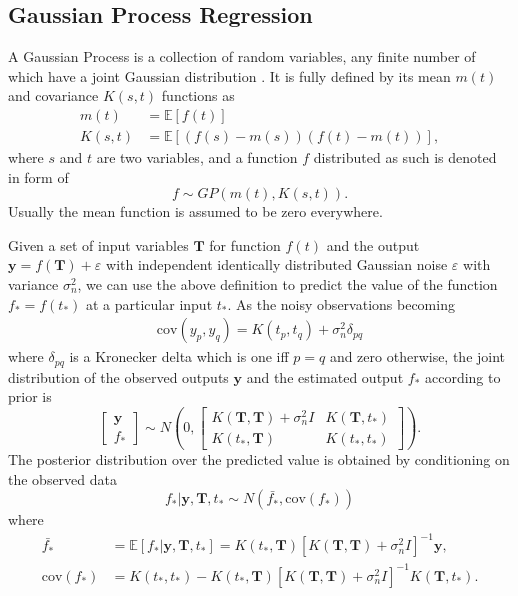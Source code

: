 \subsection{Gaussian Process Regression}

A Gaussian Process is a collection of random variables, any finite number of which have a joint Gaussian distribution \cite{b_gpml}. It is fully defined by its mean $m(t)$ and covariance $K(s,t)$ functions as
\begin{align}
m(t)&=\mathbb{E}[f(t)] \\
K(s,t)&=\mathbb{E}[(f(s)-m(s)) (f(t)-m(t))],
\end{align}
where $s$ and $t$ are two variables, and a function $f$ distributed as such is denoted in form of
\begin{equation}
f \sim GP(m(t),K(s,t)).
\end{equation}
Usually the mean function is assumed to be zero everywhere. 

Given a set of input variables $\mathbf{T}$ for function $f(t)$ and the output $\mathbf{y}=f(\mathbf{T})+\varepsilon$ with independent identically distributed Gaussian noise $\varepsilon$ with variance $\sigma_n^2$,  we can use the above definition to predict the value of the function $f_*=f(t_*)$ at a particular input $t_*$. As the noisy observations becoming
\begin{align}\label{covdef}
\text{cov}(y_p,y_q) = K(t_p,t_q)+\sigma_n^2 \delta_{pq}
\end{align}
where $\delta_{pq}$ is a Kronecker delta which is one iff $p=q$ and zero otherwise, the joint distribution of the observed outputs $\mathbf{y}$ and the estimated output $f_*$ according to prior is
\begin{equation}
\left[ \begin{matrix}
\mathbf{y}\\
f_*
\end{matrix} \right] \sim N \left(  
0,\left[   \begin{matrix}
K(\mathbf{T},\mathbf{T}) +\sigma_n^2I& K(\mathbf{T},t_*) \\
K(t_*,\mathbf{T}) & K(t_*,t_*)
\end{matrix}  \right] 
\right).
\end{equation}
The posterior distribution over the predicted value is obtained by conditioning on the observed data
\begin{equation}
f_* | \mathbf{y},\mathbf{T},t_* \sim N(\bar{f_*},\text{cov}(f_*))
\end{equation}
where 
\begin{align}
\bar{f_*}&=\mathbb{E}[f_* | \mathbf{y},\mathbf{T},t_* ]=K(t_*,\mathbf{T})[K(\mathbf{T},\mathbf{T})+\sigma_n^2I]^{-1}\mathbf{y},\\
\text{cov}(f_*)&=K(t_*,t_*)-K(t_*,\mathbf{T})[K(\mathbf{T},\mathbf{T})+\sigma_n^2I]^{-1}K(\mathbf{T},t_*).
\end{align}

